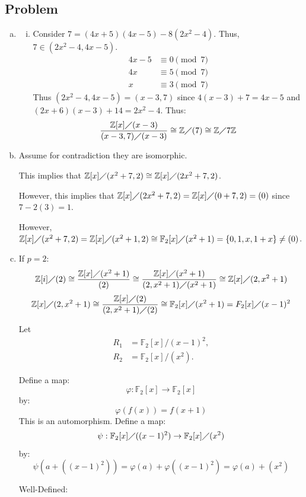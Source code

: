\documentclass[12pt, letterpaper]{article}
\newcounter{problem}
\newcommand{\q}{
    \newpage %
    \stepcounter{problem} %
    \subsection*{Problem \arabic{problem}} %
}
\newcommand{\Z}{\mathbb{Z}}
\newcommand{\F}{\mathbb{F}}
\begin{document}
\q

\begin{enumerate}[(a)]
    \item \begin{enumerate}[iv.]
        \item Consider $7=(4x+5)(4x-5)-8(2x^2-4)$. Thus, $7 \in (2x^2-4,4x-5)$.
        \begin{align*}
            4x-5 &\equiv 0 \pmod{7}\\
            4x &\equiv 5 \pmod{7}\\
            x &\equiv 3 \pmod{7}
        \end{align*}
        Thus $(2x^2-4,4x-5)=(x-3,7)$ since $4(x-3)+7=4x-5$ and $(2x+6)(x-3)+14=2x^2-4$. Thus:
        \[\dfrac{\Z[x]\diagup(x-3)}{(x-3,7) \diagup (x-3)} \cong \Z \diagup (7) \cong \Z \diagup 7\Z\]
    \end{enumerate}
    \item Assume for contradiction they are isomorphic. 
    
    This implies that $\Z[x] \diagup (x^2+7,2) \cong \Z[x] \diagup (2x^2+7,2)$. 
    
    However, this implies that $\Z[x] \diagup (2x^2+7,2)=\Z[x] \diagup (0+7,2) = (0)$ since $7-2(3)=1$. 
    
    However, $\Z[x] \diagup (x^2+7,2) = \Z[x] \diagup (x^2+1,2) \cong \F_2[x] \diagup(x^2+1)=\{0,1,x,1+x\} \neq (0)$.

    \item If $p=2$:
    \[\Z[i]\diagup (2) \cong \dfrac{\Z[x] \diagup (x^2+1)}{(2)} \cong \dfrac{\Z[x] \diagup (x^2+1)}{(2,x^2+1) \diagup (x^2+1)} \cong \Z[x] \diagup (2,x^2+1)\]
    \[\Z[x] \diagup (2,x^2+1) \cong \dfrac{\Z[x] \diagup (2)}{(2,x^2+1) \diagup (2)} \cong \F_2[x] \diagup (x^2+1)=F_2[x] \diagup (x-1)^2\]

    Let \begin{align*}
        R_1 &= \mathbb{F}_2[x]/(x-1)^2, \\
        R_2 &= \mathbb{F}_2[x]/(x^2).
    \end{align*}
    
    Define a map:
    \[
        \varphi: \F_2[x] \to \F_2[x]
    \]
    by:
    \[
        \varphi(f(x))=f(x+1)
    \]
    This is an automorphism.
    Define a map:
    \[
        \psi: \F_2[x]\diagup((x-1)^2) \to \F_2[x]\diagup(x^2)
    \]
    by:
    \[
        \psi(a+((x-1)^2))=\varphi(a)+\varphi((x-1)^2)=\varphi(a)+(x^2)
    \]

    Well-Defined:


\end{enumerate}
\end{document}
